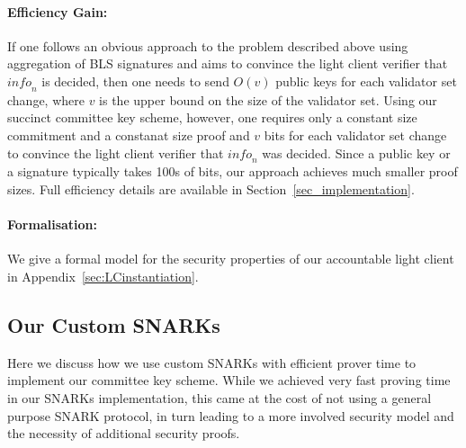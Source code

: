 \noindent\paragraph{Efficiency Gain:} If one follows an obvious approach to the problem described above using aggregation of BLS 
signatures and aims to convince the light client verifier that $\mathit{info}_n$ is decided, then one needs to send $O(v)$ 
public keys for each validator set change, where $v$ is the upper bound on the size of the validator set. Using our succinct 
committee key scheme, however, one requires only a constant size commitment and a constanat size proof and $v$ bits 
for each validator set change to convince the light client verifier that $\mathit{info}_n$ was decided. Since a public key or a 
signature typically takes 100s of bits, our approach achieves much smaller proof sizes. Full efficiency details are available in 
Section~\ref{sec_implementation}.
\vspace{-0.05in}

\noindent\paragraph{Formalisation:} We give a formal model for the security properties of our accountable light 
client in Appendix~\ref{sec:LCinstantiation}.

\vspace{-0.1cm}
\subsection{Our Custom SNARKs}
\label{sec_intro_custom_snarks}

\noindent Here we discuss how we use custom SNARKs with efficient prover time to implement our committee key scheme.
While we achieved very fast proving time in our SNARKs implementation, this came at the cost of not using a general purpose
SNARK protocol, in turn leading to a more involved security model and the necessity of additional security proofs.  \\


